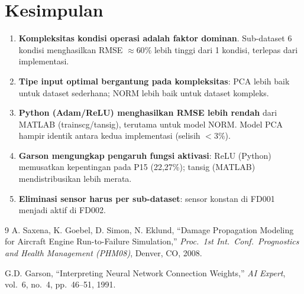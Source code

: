 \documentclass[11pt,a4paper]{article}
\begin{document}
\section{Kesimpulan}

\begin{enumerate}[noitemsep]
  \item \textbf{Kompleksitas kondisi operasi adalah faktor dominan}.
    Sub-dataset 6 kondisi menghasilkan RMSE $\approx 60\%$ lebih tinggi
    dari 1 kondisi, terlepas dari implementasi.

  \item \textbf{Tipe input optimal bergantung pada kompleksitas}:
    PCA lebih baik untuk dataset sederhana; NORM lebih baik untuk
    dataset kompleks.

  \item \textbf{Python (Adam/ReLU) menghasilkan RMSE lebih rendah}
    dari MATLAB (trainscg/tansig), terutama untuk model NORM.
    Model PCA hampir identik antara kedua implementasi
    (selisih $< 3\%$).

  \item \textbf{Garson mengungkap pengaruh fungsi aktivasi}:
    ReLU (Python) memusatkan kepentingan pada P15 (22,27\%);
    tansig (MATLAB) mendistribusikan lebih merata.

  \item \textbf{Eliminasi sensor harus per sub-dataset}:
    sensor konstan di FD001 menjadi aktif di FD002.
\end{enumerate}

\begin{thebibliography}{9}
  A. Saxena, K. Goebel, D. Simon, N. Eklund,
  ``Damage Propagation Modeling for Aircraft Engine Run-to-Failure Simulation,''
  \textit{Proc.\ 1st Int.\ Conf.\ Prognostics and Health Management (PHM08)},
  Denver, CO, 2008.

  G.D. Garson,
  ``Interpreting Neural Network Connection Weights,''
  \textit{AI Expert}, vol.~6, no.~4, pp.~46--51, 1991.
\end{thebibliography}
\end{document}
